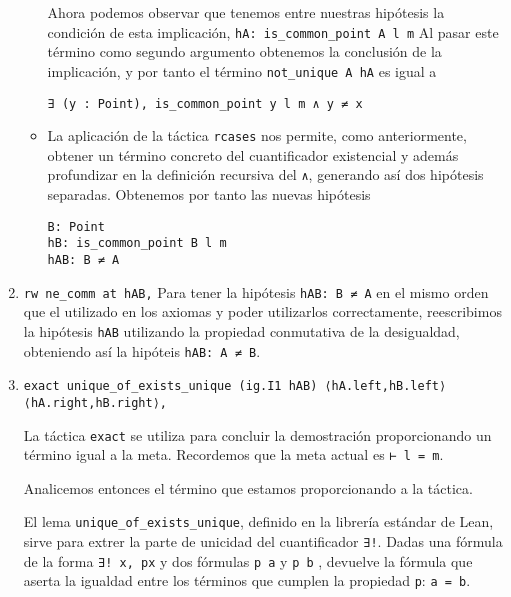 \begin{enumerate}[label=L.\arabic*, topsep=0mm]
\begin{itemize}
		            Ahora podemos observar que tenemos entre nuestras hipótesis la
		            condición de esta implicación, \lstinline{hA: is_common_point A l m}
		            Al pasar este término como segundo argumento obtenemos la conclusión
		            de la implicación, y por tanto el término
		            \lstinline{not_unique A hA} es igual a
		            \begin{lstlisting}
∃ (y : Point), is_common_point y l m ∧ y ≠ x
\end{lstlisting}

		      \item La aplicación de la táctica \lstinline{rcases} nos permite, como
		            anteriormente, obtener un término concreto del cuantificador
		            existencial y además profundizar en la definición recursiva del
		            \lstinline{∧}, generando así dos hipótesis separadas. Obtenemos por
		            tanto las nuevas hipótesis
		            \begin{lstlisting}
B: Point 
hB: is_common_point B l m 
hAB: B ≠ A
\end{lstlisting}
	      \end{itemize}

	\item \lstinline{rw ne_comm at hAB,} Para tener la hipótesis
	      \lstinline{hAB: B ≠ A} en el mismo orden que el utilizado en los axiomas y
	      poder utilizarlos correctamente, reescribimos la hipótesis \lstinline{hAB}
	      utilizando la propiedad conmutativa de la desigualdad, obteniendo así la
	      hipóteis \lstinline{hAB: A ≠ B}.

	\item \lstinline{exact unique_of_exists_unique (ig.I1 hAB) ⟨hA.left,hB.left⟩ ⟨hA.right,hB.right⟩,}

	      La táctica \lstinline{exact} se utiliza para concluir la demostración
	      proporcionando un término igual a la meta. Recordemos que la meta actual
	      es \lstinline{⊢ l = m}.

	      Analicemos entonces el término que estamos proporcionando a la táctica.

	      El lema \lstinline{unique_of_exists_unique}, definido en la librería
	      estándar de Lean, sirve para extrer la parte de unicidad del cuantificador
	      \lstinline{∃!}. Dadas una fórmula de la forma \lstinline{∃! x, px} y dos
	      fórmulas \lstinline{p a} y \lstinline{p b} , devuelve la fórmula que
	      aserta la igualdad entre los términos que cumplen la propiedad
	      \lstinline{p}: \lstinline{a = b}.


\end{enumerate}
